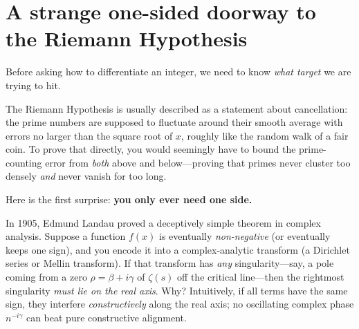 \section{A strange one-sided doorway to the Riemann Hypothesis}

Before asking how to differentiate an integer, we need to know \emph{what target} we are trying to hit.

The Riemann Hypothesis is usually described as a statement about cancellation: the prime numbers are supposed to fluctuate around their smooth average with errors no larger than the square root of \(x\), roughly like the random walk of a fair coin. To prove that directly, you would seemingly have to bound the prime-counting error from \emph{both} above and below---proving that primes never cluster too densely \emph{and} never vanish for too long.

Here is the first surprise: \textbf{you only ever need one side.}

In 1905, Edmund Landau proved a deceptively simple theorem in complex analysis. Suppose a function \(f(x)\) is eventually \emph{non-negative} (or eventually keeps one sign), and you encode it into a complex-analytic transform (a Dirichlet series or Mellin transform). If that transform has \emph{any} singularity---say, a pole coming from a zero \(\rho = \beta + i\gamma\) of \(\zeta(s)\) off the critical line---then the rightmost singularity \emph{must lie on the real axis}. Why? Intuitively, if all terms have the same sign, they interfere \emph{constructively} along the real axis; no oscillating complex phase \(n^{-i\gamma}\) can beat pure constructive alignment.

